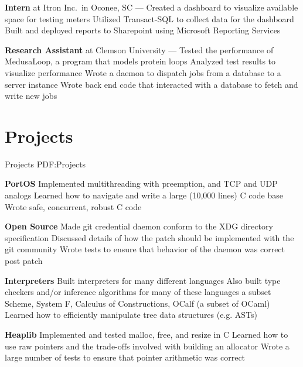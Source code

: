 \documentclass[letterpaper,10pt,oneside]{simpleresume}
\begin{document}
\begin{minipage}[t][0pt]{\linewidth}
\begin{body}
\textbf{Intern} at Itron Inc.\ in Oconee, SC
\hfill
{} --- 
\BulletItem%
Created a dashboard to visualize available space for testing meters
\BulletItem%
Utilized Transact-SQL to collect data for the dashboard
\BulletItem%
Built and deployed reports to Sharepoint using Microsoft Reporting Services

\textbf{Research Assistant} at Clemson University
\hfill
{} --- 
\BulletItem%
Tested the performance of MedusaLoop, a program that models protein loops
\BulletItem%
Analyzed test results to visualize performance
\BulletItem%
Wrote a daemon to dispatch jobs from a database to a server instance
\BulletItem%
Wrote back end code that interacted with a database to fetch and write new jobs

\section%
{Projects}
{Projects}
{PDF:Projects}

\textbf{PortOS}
\BulletItem%
Implemented multithreading with preemption, and TCP and UDP analogs
\BulletItem%
Learned how to navigate and write a large (10,000 lines) C code base
\BulletItem%
Wrote safe, concurrent, robust C code
\GapNoBreak%

\textbf{Open Source}
\BulletItem%
Made git credential daemon conform to the XDG directory specification
\BulletItem%
Discussed details of how the patch should be implemented with the git community
\BulletItem%
Wrote tests to ensure that behavior of the daemon was correct post patch
\GapNoBreak%

\textbf{Interpreters}
\BulletItem%
Built interpreters for many different languages
\BulletItem%
Also built type checkers and/or inference algorithms for many of these languages
\BulletItem%
a subset Scheme, System F, Calculus of Constructions, OCalf (a subset of OCaml)
\BulletItem%
Learned how to efficiently manipulate tree data structures (e.g. ASTs)
\GapNoBreak%

\textbf{Heaplib}
\BulletItem%
Implemented and tested malloc, free, and resize in C
\BulletItem%
Learned how to use raw pointers and the trade-offs involved with building
an allocator
\BulletItem%
Wrote a large number of tests to ensure that pointer arithmetic was correct
\GapNoBreak%



\end{body}
\end{minipage}
\end{document}
